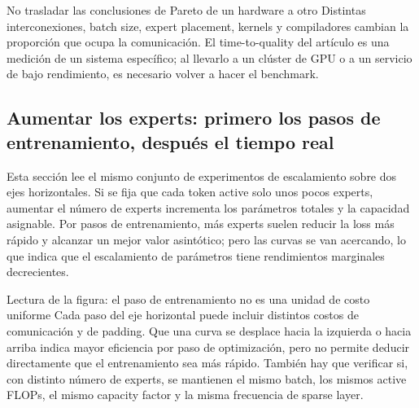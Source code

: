 
\begin{warningbox}{No trasladar las conclusiones de Pareto de un hardware a otro}
Distintas interconexiones, batch size, expert placement, kernels y compiladores cambian la proporción que ocupa la comunicación. El time-to-quality del artículo es una medición de un sistema específico; al llevarlo a un clúster de GPU o a un servicio de bajo rendimiento, es necesario volver a hacer el benchmark.
\end{warningbox}

\subsection{Aumentar los experts: primero los pasos de entrenamiento, después el tiempo real}

Esta sección lee el mismo conjunto de experimentos de escalamiento sobre dos ejes horizontales. Si se fija que cada token active solo unos pocos experts, aumentar el número de experts incrementa los parámetros totales y la capacidad asignable. Por pasos de entrenamiento, más experts suelen reducir la loss más rápido y alcanzar un mejor valor asintótico; pero las curvas se van acercando, lo que indica que el escalamiento de parámetros tiene rendimientos marginales decrecientes.


\begin{knowledgebox}{Lectura de la figura: el paso de entrenamiento no es una unidad de costo uniforme}
Cada paso del eje horizontal puede incluir distintos costos de comunicación y de padding. Que una curva se desplace hacia la izquierda o hacia arriba indica mayor eficiencia por paso de optimización, pero no permite deducir directamente que el entrenamiento sea más rápido. También hay que verificar si, con distinto número de experts, se mantienen el mismo batch, los mismos active FLOPs, el mismo capacity factor y la misma frecuencia de sparse layer.
\end{knowledgebox}

